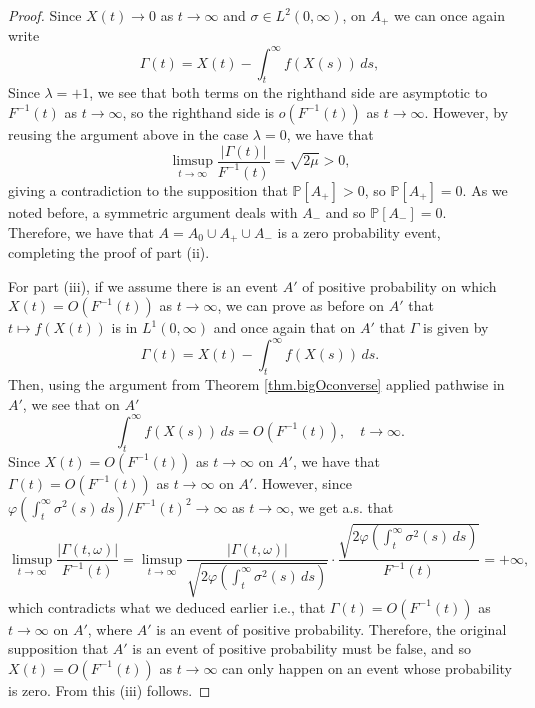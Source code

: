 \documentclass[a4paper,10pt,reqno]{amsart}
\numberwithin{equation}{section}
\theoremstyle{definition}
\theoremstyle{remark}
\DeclareMathOperator{\1}{\mathbbm 1}
\begin{document}
\begin{proof}
		Since $X(t)\to 0$ as $t\to\infty$ and $\sigma\in L^2(0,\infty)$, on $A_+$ we can once again write
		\[
		\Gamma(t) = X(t) - \int_t^\infty f(X(s)) \, ds,
		\]
		Since $\lambda=+1$, we see that both terms on the righthand side are asymptotic to $F^{-1}(t)$ as $t\to\infty$, so the righthand side is $o(F^{-1}(t))$ as $t\to\infty$. However, by reusing the argument above in the case $\lambda=0$, we have that 
		\[
		\limsup_{t\to\infty} \frac{|\Gamma(t)|}{F^{-1}(t)}=\sqrt{2\mu}>0,
		\] 
		giving a contradiction to the supposition that $\mathbb{P}[A_+]>0$, so $\mathbb{P}[A_+]=0$.
		As we noted before, a symmetric argument deals with $A_-$ and so $\mathbb{P}[A_-]=0$. Therefore, we have that $A=A_0\cup A_+\cup A_-$ is a zero probability event, completing the proof of part (ii).  
		
		For part (iii), if we assume there is an event $A'$ of positive probability on which $X(t)=O(F^{-1}(t))$ as $t\to\infty$, we can prove as before on $A'$ that $t\mapsto f(X(t))$ is in $L^1(0,\infty)$ and once again that on $A'$ that $\Gamma$ is given by 
		\[
		\Gamma(t) = X(t) - \int_t^\infty f(X(s)) \, ds.
		\]
		Then, using the argument from Theorem \ref{thm.bigOconverse} applied pathwise in $A'$, we see that on $A'$
		\[
		\int_t^\infty f(X(s)) \, ds = O(F^{-1}(t)), \quad t\to\infty.
		\]
		Since $X(t)=O(F^{-1}(t))$ as $t\to\infty$ on $A'$, we have that 
		$\Gamma(t)=O(F^{-1}(t))$ as $t\to\infty$ on $A'$. However, since 
		$\varphi(\int_t^\infty \sigma^2(s)\,ds)/F^{-1}(t)^2\to \infty$ as $t\to\infty$, we get a.s. that 
		\[
		\limsup_{t \to \infty} \frac{|\Gamma(t,\omega)|}{F^{-1}(t)}
		= \limsup_{t \to \infty} \frac{|\Gamma(t,\omega)|}
		{\sqrt{2 \varphi\!\left(\int_t^\infty \sigma^2(s)\, ds\right)}} 
		\cdot
		\frac{\sqrt{2 \varphi\!\left(\int_t^\infty \sigma^2(s)\, ds\right)}}{F^{-1}(t)}=+\infty,
		\]
		which contradicts what we deduced earlier i.e., that $\Gamma(t)=O(F^{-1}(t))$ as $t\to\infty$ on $A'$, where $A'$ is an event of positive probability. Therefore, the original supposition that $A'$ is an event of positive probability must be false, and so 
		$X(t)=O(F^{-1}(t))$ as $t\to\infty$ can only happen on an event whose probability is zero. From this (iii) follows. 
	\end{proof}
	
\end{document}
